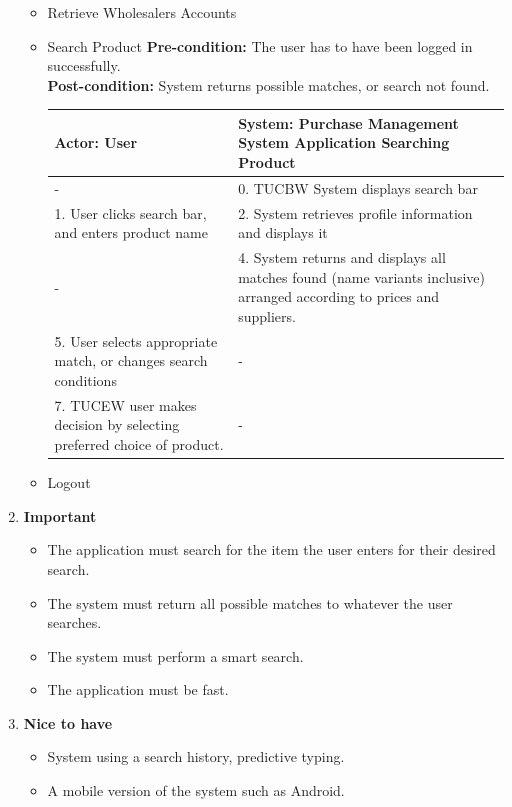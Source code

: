 \documentclass[a4paper,10pt]{article}
\begin{document}
\begin{enumerate}
\begin{itemize}
				\item Retrieve Wholesalers Accounts 
				\item Search Product 
				\textbf{Pre-condition: } The user has to have been logged in successfully.  \\
				\textbf{Post-condition: }  System returns possible matches, or search not found. \\
				\begin{center}
				\begin{tabular}{ |p{8cm}|p{8cm}| }
				 \hline
  				\textbf{Actor:} User & \textbf{System: Purchase Management System Application} Searching Product \\
				 \hline
				 - & 0. TUCBW System displays search bar\\
				 \hline
				  1. User clicks search bar, and enters product name & 2. System retrieves profile information and displays it\\
				 \hline
				 - & 4. System returns and displays all matches found (name variants inclusive)  arranged according to prices and suppliers. \\
				 \hline
				5. User selects appropriate match, or changes search conditions & - \\
				 \hline
				7. TUCEW user makes decision by selecting preferred choice of product. & - \\
				\hline
				\end{tabular}
				\end{center}
				\item Logout
			\end{itemize} 
		\item \textbf{Important} 
		\begin{itemize}
                \item The application must search for the item the user enters for their desired search. 
                \item The system must return all possible matches to whatever the user searches.
		\item The system must perform a smart search.
		\item The application must be fast.
                \end{itemize}
		
		\item \textbf{Nice to have}
		\begin{itemize}
		\item System using a search history, predictive typing. 
		\item A mobile version of the system such as Android.
		\end{itemize}
		\end{enumerate} 
\end{document}
